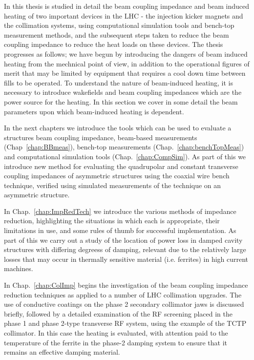 In this thesis is studied in detail the beam coupling impedance and beam induced heating of two important devices in the LHC - the injection kicker magnets and the collimation systems, using computational simulation tools and bench-top measurement methods, and the subsequent steps taken to reduce the beam coupling impedance to reduce the heat loads on these devices. The thesis progresses as follows; we have begun by introducing the dangers of beam induced heating from the mechnical point of view, in addition to the operational figures of merit that may be limited by equipment that requires a cool down time between fills to be operated. To understand the nature of beam-induced heating, it is necessary to introduce wakefields and beam coupling impedances which are the power source for the heating. In this section we cover in some detail the beam parameters upon which beam-induced heating is dependent.

In the next chapters we introduce the tools which can be used to evaluate a structures beam coupling impedance, beam-based measurements (Chap~\ref{chap:BBmeas}), bench-top measurements (Chap.~\ref{chap:benchTopMeas}) and computational simulation tools (Chap.~\ref{chap:CompSim}). As part of this we introduce new method for evaluating the quadrupolar and constant transverse coupling impedances of asymmetric structures using the coaxial wire bench technique, verified using simulated measurements of the technique on an asymmetric structure.

In Chap.~\ref{chap:ImpRedTech} we introduce the various methods of impedance reduction, highlighting the situations in which each is appropriate, their limitations in use, and some rules of thumb for successful implementation. As part of this we carry out a study of the location of power loss in damped cavity structures with differing degreess of damping, relevant due to the relatively large losses that may occur in thermally sensitive material (i.e. ferrites) in high current machines.

In Chap.~\ref{chap:ColImp} begins the investigation of the beam coupling impedance reduction techniques as applied to a number of LHC collimation upgrades. The use of conductive coatings on the phase 2 secondary collimator jaws is discussed briefly, followed by a detailed examination of the RF screening placed in the phase 1 and phase 2-type transverse RF system, using the example of the TCTP collimator. In this case the heating is evaluated, with attention paid to the temperature of the ferrite in the phase-2 damping system to ensure that it remains an effective damping material.

